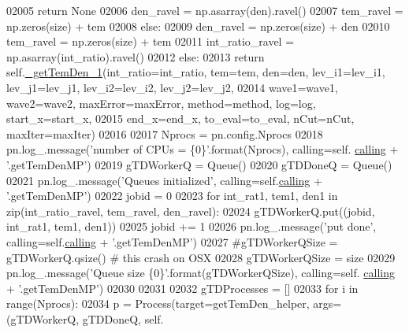 \begin{DoxyCode}
02005                     \textcolor{keywordflow}{return} \textcolor{keywordtype}{None}
02006                 den\_ravel = np.asarray(den).ravel()
02007                 tem\_ravel = np.zeros(size) + tem
02008             \textcolor{keywordflow}{else}:
02009                 den\_ravel = np.zeros(size) + den
02010                 tem\_ravel = np.zeros(size) + tem
02011             int\_ratio\_ravel = np.asarray(int\_ratio).ravel()
02012         \textcolor{keywordflow}{else}:
02013             \textcolor{keywordflow}{return} self.\hyperlink{classpyneb_1_1core_1_1pynebcore_1_1_atom_ad1d75f64b27a6acee079b5738b69dabe}{\_getTemDen\_1}(int\_ratio=int\_ratio, tem=tem, den=den, lev\_i1=lev\_i1, 
      lev\_j1=lev\_j1, lev\_i2=lev\_i2, lev\_j2=lev\_j2,
02014                   wave1=wave1, wave2=wave2, maxError=maxError, method=method, log=log, start\_x=start\_x,
02015                   end\_x=end\_x, to\_eval=to\_eval, nCut=nCut, maxIter=maxIter)
02016         
02017         Nprocs = pn.config.Nprocs
02018         pn.log\_.message(\textcolor{stringliteral}{'number of CPUs = \{0\}'}.format(Nprocs), calling=self.
      \hyperlink{classpyneb_1_1core_1_1pynebcore_1_1_atom_a373b7735acf4f528b54bddf373ad67a1}{calling} + \textcolor{stringliteral}{'.getTemDenMP'})
02019         gTDWorkerQ = Queue()
02020         gTDDoneQ = Queue()
02021         pn.log\_.message(\textcolor{stringliteral}{'Queues initialized'}, calling=self.\hyperlink{classpyneb_1_1core_1_1pynebcore_1_1_atom_a373b7735acf4f528b54bddf373ad67a1}{calling} + \textcolor{stringliteral}{'.getTemDenMP'})
02022         jobid = 0
02023         \textcolor{keywordflow}{for} int\_rat1, tem1, den1 \textcolor{keywordflow}{in} zip(int\_ratio\_ravel, tem\_ravel, den\_ravel):
02024             gTDWorkerQ.put((jobid, int\_rat1, tem1, den1))
02025             jobid += 1
02026         pn.log\_.message(\textcolor{stringliteral}{'put done'}, calling=self.\hyperlink{classpyneb_1_1core_1_1pynebcore_1_1_atom_a373b7735acf4f528b54bddf373ad67a1}{calling} + \textcolor{stringliteral}{'.getTemDenMP'})
02027         \textcolor{comment}{#gTDWorkerQSize = gTDWorkerQ.qsize() # this crash on OSX}
02028         gTDWorkerQSize = size
02029         pn.log\_.message(\textcolor{stringliteral}{'Queue size \{0\}'}.format(gTDWorkerQSize), calling=self.
      \hyperlink{classpyneb_1_1core_1_1pynebcore_1_1_atom_a373b7735acf4f528b54bddf373ad67a1}{calling} + \textcolor{stringliteral}{'.getTemDenMP'})
02030 
02031         
02032         gTDProcesses = []
02033         \textcolor{keywordflow}{for} i \textcolor{keywordflow}{in} range(Nprocs):
02034             p = Process(target=getTemDen\_helper, args=(gTDWorkerQ, gTDDoneQ, self.

\end{DoxyCode}
